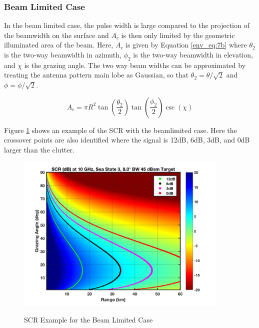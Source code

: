 \subsubsection{Beam Limited Case}
In the beam limited case, the pulse width is large compared to the projection of the beamwidth on the surface and $A_c$ is then only limited by the geometric illuminated area of the beam. Here, $A_c$ is given by Equation \ref{env_eq:7b} where $\theta_2$ is the two-way beamwidth in azimuth, $\phi_2$ is the two-way beamwidth in elevation, and $\chi$ is the grazing angle. The two way beam widths can be approximated by treating the antenna pattern main lobe as Gaussian, so that $\theta_2 = \theta/\sqrt{2}$ and $\phi = \phi/\sqrt{2}$.

\begin{equation}
\label{env_eq:7b}
A_c = \pi R^2\tan\left(\frac{\theta_2}{2}\right)\tan\left(\frac{\phi_2}{2}\right)\csc(\chi)
\end{equation}
\renewcommand{\baselinestretch}{2} \small\normalsize

Figure \ref{env_fig:3z} shows an example of the SCR with the beamlimited case. Here the crossover points are also identified where the signal is 12dB, 6dB, 3dB, and 0dB larger than the clutter.

\begin{figure}[H]
  \begin{center}
\includegraphics[width=4in]{../media/multistatic/scr.png}
  \end{center}
  \renewcommand{\baselinestretch}{1} \small\normalsize
  \begin{quote}
    \caption[SCR Example for the Beam Limited Case]{SCR Example for the Beam Limited Case\label{env_fig:3z}}
  \end{quote}
\end{figure}
\renewcommand{\baselinestretch}{2} \small\normalsize

